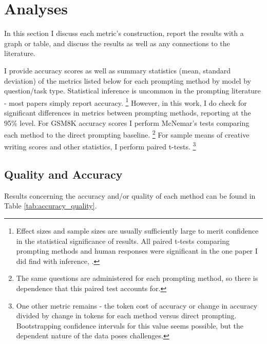 \documentclass[11pt]{article}
\begin{document}
\section*{Analyses}

In this section I discuss each metric's construction, report the results with a graph or table, and discuss the results as well as any connections to the literature.

I provide accuracy scores as well as summary statistics (mean, standard deviation) of the metrics listed below for each prompting method by model by question/task type. Statistical inference is uncommon in the prompting literature - most papers simply report accuracy. \footnote{Effect sizes and sample sizes are usually sufficiently large to merit confidence in the statistical significance of results. All paired t-tests comparing prompting methods and human responses were significant in the one paper I did find with inference, \citealp{pu_chatgpt_2023}.} However, in this work, I do check for significant differences in metrics between prompting methods, reporting at the 95\% level. For GSM8K accuracy scores I perform McNemar's tests comparing each method to the direct prompting baseline. \footnote{The same questions are administered for each prompting method, so there is dependence that this paired test accounts for.} For sample means of creative writing scores and other statistics, I perform paired t-tests. \footnote{One other metric remains - the token cost of accuracy or change in accuracy divided by change in tokens for each method versus direct prompting. Bootstrapping confidence intervals for this value seems possible, but the dependent nature of the data poses challenges.}

\subsection*{Quality and Accuracy}

Results concerning the accuracy and/or quality of each method can be found in Table \ref{tab:accuracy_quality}.
\end{document}
